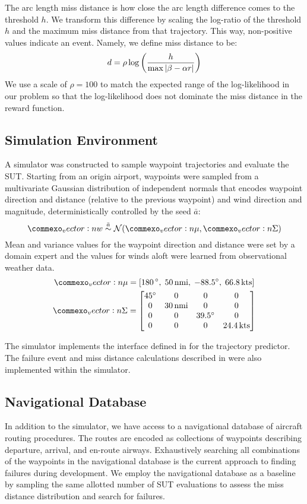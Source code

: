 The arc length miss distance is how close the arc length difference comes to the threshold $h$.
We transform this difference by scaling the log-ratio of the threshold $h$ and the maximum miss distance from that trajectory.
This way, non-positive values indicate an event.
Namely, we define miss distance to be:
\begin{equation} \label{eq:miss}
  d = \rho\log\left(\frac{h}{\max\,\abs{\beta - \alpha r}}\right)
\end{equation}
We use a scale of $\rho=100$ to match the expected range of the log-likelihood in our problem so that the log-likelihood does not dominate the miss distance in the reward function.  


\subsection{Simulation Environment}
A simulator was constructed to sample waypoint trajectories and evaluate the SUT.
Starting from an origin airport, waypoints were sampled from a multivariate Gaussian distribution of independent normals that encodes waypoint direction and distance (relative to the previous waypoint) and wind direction and magnitude, deterministically controlled by the seed $\bar{a}$:
\begin{equation}
  \vec{w} \overset{\bar{a}}{\sim} \Normal(\vec{\mu}, \vec{\Sigma})
\end{equation}
Mean and variance values for the waypoint direction and distance were set by a domain expert and the values for winds aloft were learned from observational weather data.
\begin{gather*}
\vec{\mu} = \left[180\,\si{\degree},\; 50\,\si{nmi},\; -88.5\si{\degree},\; 66.8\,\si{kts}\right]\\
\mat{\Sigma} = \begin{bmatrix}
45\si{\degree} & 0 & 0 & 0\\
0 & 30\,\si{nmi} & 0 & 0\\
0 & 0 & 39.5\si{\degree} & 0\\
0 & 0 & 0 & 24.4\,\si{kts}
\end{bmatrix}
\end{gather*}

The simulator implements the interface defined in  for the trajectory predictor.
The failure event and miss distance calculations described in  were also implemented within the simulator.

\subsection{Navigational Database}
In addition to the simulator, we have access to a navigational database of aircraft routing procedures.
The routes are encoded as collections of waypoints describing departure, arrival, and en-route airways.
Exhaustively searching all combinations of the waypoints in the navigational database is the current approach to finding failures during development.
We employ the navigational database as a baseline by sampling the same allotted number of SUT evaluations to assess the miss distance distribution and search for failures.



